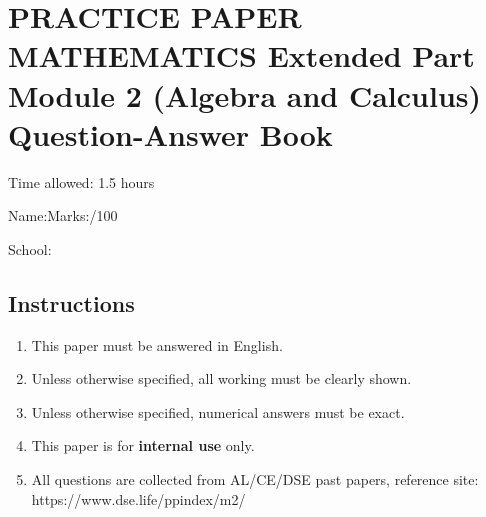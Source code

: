 \documentclass[12pt]{article}
\begin{document}
    \thispagestyle{plain}

    \centering 

    \section*{PRACTICE PAPER\\MATHEMATICS Extended Part\\Module 2 (Algebra and Calculus)\\Question-Answer Book}

    Time allowed: 1.5 hours

    Name:\hrulefill \hfill Marks:\hrulefill/100

    School:\hrulefill

    \raggedright

    \subsection*{Instructions}

    \begin{enumerate}
        \item This paper must be answered in English.
        \item Unless otherwise specified, all working must be clearly shown.
        \item Unless otherwise specified, numerical answers must be exact.
        \item This paper is for \textbf{internal use} only.
        \item All questions are collected from AL/CE/DSE past papers, reference site: https://www.dse.life/ppindex/m2/
    \end{enumerate}
\end{document}
